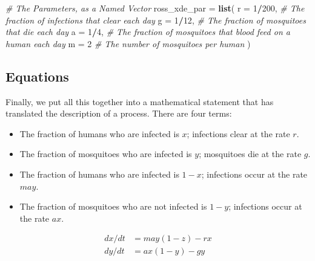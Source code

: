 \documentclass[
]{book}
\newenvironment{Shaded}{\begin{snugshade}}{\end{snugshade}}
\newcommand{\AttributeTok}[1]{\textcolor[rgb]{0.13,0.29,0.53}{#1}}
\newcommand{\CommentTok}[1]{\textcolor[rgb]{0.56,0.35,0.01}{\textit{#1}}}
\newcommand{\DecValTok}[1]{\textcolor[rgb]{0.00,0.00,0.81}{#1}}
\newcommand{\FunctionTok}[1]{\textcolor[rgb]{0.13,0.29,0.53}{\textbf{#1}}}
\newcommand{\NormalTok}[1]{#1}
\newcommand{\OtherTok}[1]{\textcolor[rgb]{0.56,0.35,0.01}{#1}}
\newcommand{\SpecialCharTok}[1]{\textcolor[rgb]{0.81,0.36,0.00}{\textbf{#1}}}
\begin{document}
\begin{Shaded}
\begin{Highlighting}[]
\CommentTok{\# The Parameters, as a Named Vector}
\NormalTok{ross\_xde\_par }\OtherTok{=} \FunctionTok{list}\NormalTok{(}
  \AttributeTok{r =} \DecValTok{1}\SpecialCharTok{/}\DecValTok{200}\NormalTok{, }\CommentTok{\# The fraction of infections that clear each day}
  \AttributeTok{g =} \DecValTok{1}\SpecialCharTok{/}\DecValTok{12}\NormalTok{,  }\CommentTok{\# The fraction of mosquitoes that die each day}
  \AttributeTok{a =} \DecValTok{1}\SpecialCharTok{/}\DecValTok{4}\NormalTok{,   }\CommentTok{\# The fraction of mosquitoes that blood feed on a human each day}
  \AttributeTok{m =} \DecValTok{2}      \CommentTok{\# The number of mosquitoes per human}
\NormalTok{) }
\end{Highlighting}
\end{Shaded}

\subsection{Equations}\label{equations-1}

Finally, we put all this together into a mathematical statement that has translated the description of a process. There are four terms:

\begin{itemize}
\item
  The fraction of humans who are infected is \(x\); infections clear at the rate \(r.\)
\item
  The fraction of mosquitoes who are infected is \(y\); mosquitoes die at the rate \(g.\)
\item
  The fraction of humans who are infected is \(1-x\); infections occur at the rate \(m a y.\)
\item
  The fraction of mosquitoes who are not infected is \(1-y\); infections occur at the rate \(a x.\)
\end{itemize}

\[ 
\begin{array}{rl}
dx/dt &= may(1-z) - r x\\
dy/dt &= ax(1-y) - g y \\
\end{array}
\]
\end{document}

